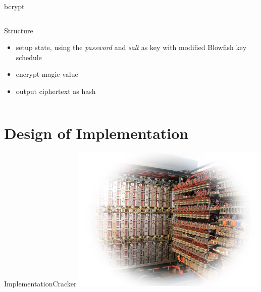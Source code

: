\begin{frame}{bcrypt}
	\begin{columns}[T]
		\begin{column}{.47\textwidth}
			\begin{block}{Structure}
				\begin{itemize}
					\item setup state, using the \emph{password} and \emph{salt} as key with
						 modified Blowfish key schedule
					\item encrypt magic value
					\item output ciphertext as hash
				\end{itemize}
			\end{block}
		\end{column}
	\end{columns}
\end{frame}

\section{Design of Implementation}

\begin{frame}{Implementation}{Cracker}
		\center \includegraphics[height=70mm]{data/flickr/bombe_bletchly_park.png}
\end{frame}

